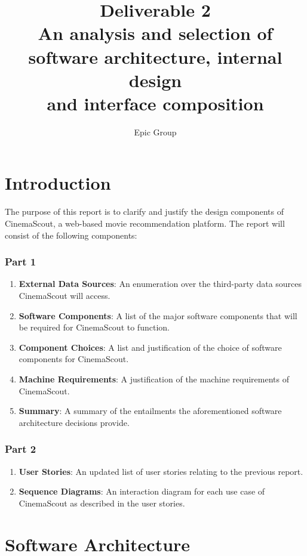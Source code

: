 \documentclass{article}
\begin{document}
\title{%
 Deliverable 2\\
 \large An analysis and selection of software architecture, internal design\\
 \large and interface composition
}
\author{Epic Group}
\date{}
\maketitle

\section*{Introduction}
The purpose of this report is to clarify and justify the design components of 
CinemaScout, a web-based movie recommendation platform. The report will consist
of the following components:
\subsubsection*{Part 1}
\begin{enumerate}
\item \textbf{External Data Sources}: An enumeration over the third-party data
sources CinemaScout will access.
\item \textbf{Software Components}: A list of the major software components
that will be required for CinemaScout to function.
\item \textbf{Component Choices}: A list and justification of the choice of
software components for CinemaScout.
\item \textbf{Machine Requirements}: A justification of the machine requirements
of CinemaScout.
\item \textbf{Summary}: A summary of the entailments the aforementioned
software architecture decisions provide.
\end{enumerate}
\subsubsection*{Part 2}
\begin{enumerate}
\item \textbf{User Stories}: An updated list of user stories relating to the
previous report.
\item \textbf{Sequence Diagrams}: An interaction diagram for each use case
of CinemaScout as described in the user stories.
\end{enumerate}
\section{Software Architecture}
\end{document}
